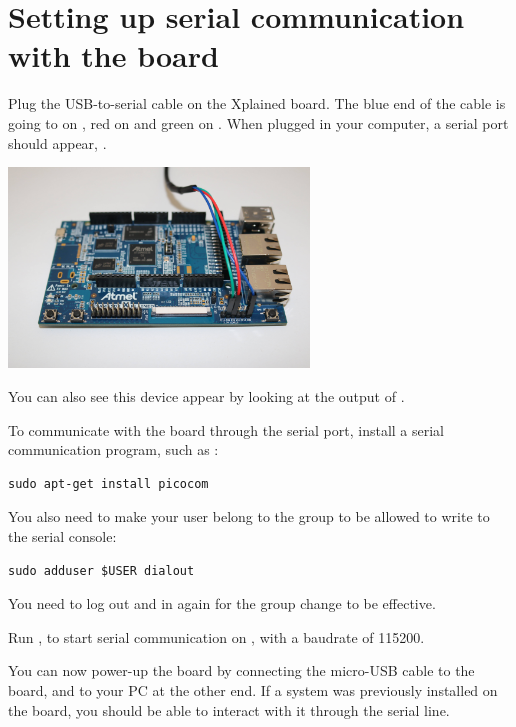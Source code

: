 \section{Setting up serial communication with the board}

Plug the USB-to-serial cable on the Xplained board. The blue end of
the cable is going to  on , red on  and
green on . When plugged in your computer, a serial port
should appear, .

\begin{center}
\includegraphics[width=8cm]{labs/sysdev-u-boot/xplained-serial-connector.jpg}
\end{center}

You can also see this device appear by looking at the output of
.

To communicate with the board through the serial port, install a
serial communication program, such as :

\begin{verbatim}
sudo apt-get install picocom
\end{verbatim}

You also need to make your user belong to the  group to be
allowed to write to the serial console:

\begin{verbatim}
sudo adduser $USER dialout
\end{verbatim}

You need to log out and in again for the group change to be effective.

Run , to start serial
communication on , with a baudrate of 115200.

You can now power-up the board by connecting the micro-USB cable to 
the board, and to your PC at the other end. If a system was previously
installed on the board, you should be able to interact with it
through the serial line.

